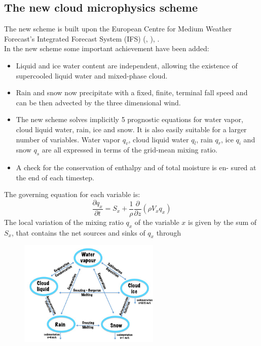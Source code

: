 {\subsection{The new cloud microphysics scheme}

The new scheme is built upon the European Centre for Medium Weather Forecast's Integrated Forecast System (IFS) (\citet{tiedtke:93}, \citet{tompkins:07}),
\citet{gmd-9-2533-2016}. \\
In the new scheme some important achievement have been added:
\begin{itemize}
\item Liquid and ice water content are independent, allowing the existence of supercooled liquid water and mixed-phase cloud.
\item Rain and snow now precipitate with a fixed, finite, terminal fall speed and can be then advected by the three dimensional wind.
\item The new scheme solves implicitly 5 prognostic equations for water vapor, cloud liquid water, rain, ice and snow. It is also easily suitable for a larger number of variables. Water vapor $q_v$, cloud liquid water $q_l$, rain $q_r$, ice $q_i$ and snow $q_s$ are all expressed in terms of the grid-mean mixing ratio.
\item A check for the conservation of enthalpy and of total moisture is en- sured at the end of each timestep.
\end{itemize}
The governing equation for each variable is:
\begin{equation}
\frac{\partial q_x}{\partial t}= S_x +\frac{1}{\rho}\frac{\partial}{\partial z}(\rho V_x q_x)
\end{equation}
The local variation of the mixing ratio $q_x$ of the variable $x$ is given by the sum of $S_x$, that contains the net sources and sinks of $q_x$ through 
\begin{figure} [htpb!]%
\begin{center}
\includegraphics[width=0.6\textwidth]{scheme_var2.jpg}

\end{center}
\end{figure}}
